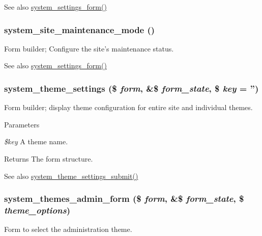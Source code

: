 \begin{DoxySeeAlso}{See also}
\hyperlink{group__forms_ga6fb270d34465d846cd4659a85d3e40c8}{system\_\-settings\_\-form()} 
\end{DoxySeeAlso}
\hypertarget{group__forms_gab7ca2edb8afa1a46eb6f96abda8e2208}{
\subsubsection[{system\_\-site\_\-maintenance\_\-mode}]{\setlength{\rightskip}{0pt plus 5cm}system\_\-site\_\-maintenance\_\-mode ()}}
\label{group__forms_gab7ca2edb8afa1a46eb6f96abda8e2208}
Form builder; Configure the site's maintenance status.

\begin{DoxySeeAlso}{See also}
\hyperlink{group__forms_ga6fb270d34465d846cd4659a85d3e40c8}{system\_\-settings\_\-form()} 
\end{DoxySeeAlso}
\hypertarget{group__forms_ga5b2e00be741c5eae4eb1e56c862a68d5}{
\subsubsection[{system\_\-theme\_\-settings}]{\setlength{\rightskip}{0pt plus 5cm}system\_\-theme\_\-settings (\$ {\em form}, \/  \&\$ {\em form\_\-state}, \/  \$ {\em key} = {\ttfamily ''})}}
\label{group__forms_ga5b2e00be741c5eae4eb1e56c862a68d5}
Form builder; display theme configuration for entire site and individual themes.


\begin{DoxyParams}{Parameters}
\item[{\em \$key}]A theme name. \end{DoxyParams}
\begin{DoxyReturn}{Returns}
The form structure.
\end{DoxyReturn}
\begin{DoxySeeAlso}{See also}
\hyperlink{system_8admin_8inc_a5403622cfdf9642a628637c4b4836c72}{system\_\-theme\_\-settings\_\-submit()} 
\end{DoxySeeAlso}
\hypertarget{group__forms_gad1993e041cd4138670f61859507ba9ac}{
\subsubsection[{system\_\-themes\_\-admin\_\-form}]{\setlength{\rightskip}{0pt plus 5cm}system\_\-themes\_\-admin\_\-form (\$ {\em form}, \/  \&\$ {\em form\_\-state}, \/  \$ {\em theme\_\-options})}}
\label{group__forms_gad1993e041cd4138670f61859507ba9ac}
Form to select the administration theme.

